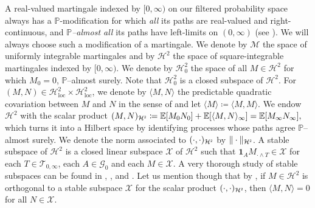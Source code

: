 \documentclass[10pt]{article} %
\newcommand\cG{\mathcal G}
\newcommand\cH{\mathcal H}
\newcommand\cM{\mathcal M}
\newcommand\cT{\mathcal T}
\newcommand\cX{\mathcal X}
\newcommand{\smalltext}[1]{\text{\fontsize{4}{4}\selectfont$#1$}}
\def \E{\mathbb{E}}
\def \P{\mathbb{P}}
\newcommand{\1}{\mathbf{1}}
\begin{document}
\medskip
A real-valued martingale indexed by $[0,\infty)$ on our filtered probability space always has a $\P$-modification for which \emph{all} its paths are real-valued and right-continuous, and \emph{$\P$--almost all} its paths have left-limits on $(0,\infty)$ (see \citeauthor*{weizsaecker1990stochastic} \cite[Theorem 3.2.6]{weizsaecker1990stochastic}).  We will always choose such a modification of a martingale. We denote by $\cM$ the space of uniformly integrable martingales and by $\cH^2$ the space of square-integrable martingales indexed by $[0,\infty)$. We denote by $\cH^2_0$ the space of all $M \in \cH^2$ for which $M_0 = 0$, $\P$--almost surely. Note that $\cH^2_0$ is a closed subspace of $\cH^2$. For $(M,N) \in \cH^2_\mathrm{loc} \times \cH^2_\mathrm{loc}$, we denote by $\langle M, N \rangle$ the predictable quadratic covariation between $M$ and $N$ in the sense of \cite[Theorem I.4.2]{jacod2003limit} and let $\langle M \rangle \coloneqq \langle M,M \rangle$. We endow $\cH^2$ with the scalar product $( M , N )_{\cH^{\smalltext{2}}} \coloneqq \E[M_0N_0] + \E[\langle M, N \rangle_\infty] = \E[M_\infty N_\infty],$ which turns it into a Hilbert space by identifying processes whose paths agree $\P$--almost surely. We denote the norm associated to $(\cdot,\cdot)_{\cH^\smalltext{2}}$ by $\|\cdot\|_{\cH^\smalltext{2}}$. A stable subspace of $\cH^2$ is a closed linear subspace $\cX$ of $\cH^2$ such that $\mathbf{1}_A M_{\cdot \land T} \in \cX$ for each $T \in \cT_{0,\infty}$, each $A \in \cG_0$ and each $M \in \cX$. A very thorough study of stable subspaces can be found in \citeauthor*{cohen2015stochastic} \cite{cohen2015stochastic}, \citeauthor*{jacod1979calcul} \cite{jacod1979calcul}, and \citeauthor*{protter2005stochastic} \cite{protter2005stochastic}. Let us mention though that by \cite[Proposition 4.26]{jacod1979calcul}, if $M \in \cH^2$ is orthogonal to a stable subspace $\cX$ for the scalar product $(\cdot,\cdot)_{\cH^\smalltext{2}}$, then $\langle M,N\rangle = 0$ for all $N \in \cX$. 
\end{document}
